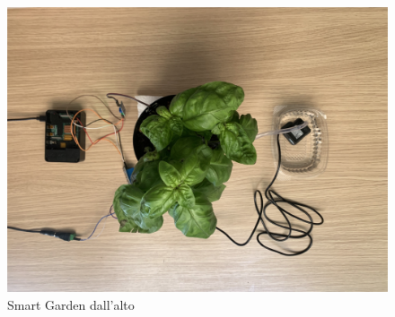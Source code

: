 \begin{figure}
    \centering
    \includegraphics[width=12cm]{Immagini/smart_garden_4}
    \caption{Smart Garden dall'alto}
    \label{fig:smart_garden_4}
\end{figure}